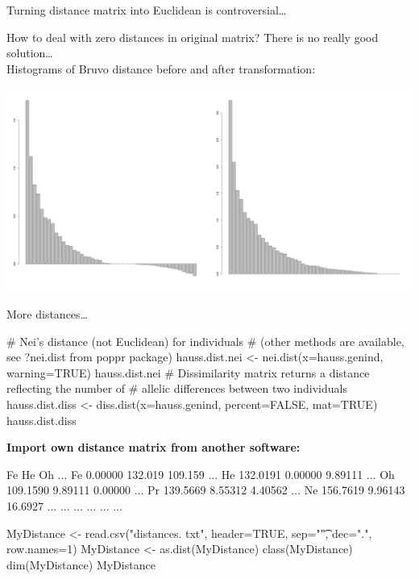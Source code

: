 \documentclass[compress, ucs, xelatex, 11pt, xcolor=svgnames,
  hyperref={
    bookmarks=true,
    unicode=true,
    colorlinks=true,
    pdftitle={Molecular data in R},
    plainpages=false,
    pdfauthor={Vojtech Zeisek},
    pdfsubject={Course about phylogeny and evolution in R},
    pdfcreator={XeLaTeX},
    pdfkeywords={R, evolution, phylogeny, molecular data},
    linkcolor=Tomato,
    anchorcolor=SaddleBrown,
    citecolor=Goldenrod,
    filecolor=DarkMagenta,
    menucolor=Sienna,
    urlcolor=DarkTurquoise,
    pdftex},
  url={hyphens, lowtilde} %
  ]{beamer}
\begin{document}
\begin{frame}{Turning distance matrix into Euclidean is controversial\ldots}
\begin{footnotesize}
  How to deal with zero distances in original matrix? There is no really good solution\ldots\\ Histograms of Bruvo distance before and after transformation:
\end{footnotesize}
\begin{center}
  \includegraphics[width=\textwidth]{bruvodist.png}
\end{center}
\end{frame}

\begin{frame}[fragile]{More distances\ldots}
  \begin{spluscode}
    # Nei's distance (not Euclidean) for individuals
    # (other methods are available, see ?nei.dist from poppr package)
    hauss.dist.nei <- nei.dist(x=hauss.genind, warning=TRUE)
    hauss.dist.nei
    # Dissimilarity matrix returns a distance reflecting the number of
    # allelic differences between two individuals
    hauss.dist.diss <- diss.dist(x=hauss.genind, percent=FALSE, mat=TRUE)
    hauss.dist.diss
  \end{spluscode}
\vfill
\textbf{Import own distance matrix from another software:}
\begin{multicols}{2}
  \begin{spluscode}
       Fe       He      Oh      ...
    Fe 0.00000  132.019 109.159 ...
    He 132.0191 0.00000 9.89111 ...
    Oh 109.1590 9.89111 0.00000 ...
    Pr 139.5669 8.55312 4.40562 ...
    Ne 156.7619 9.96143 16.6927 ...
    ... ...     ...     ...     ...
  \end{spluscode}
  \columnbreak
  \begin{spluscode}
    MyDistance <- read.csv("distances.
      txt", header=TRUE, sep="\t",
      dec=".", row.names=1)
    MyDistance <- as.dist(MyDistance)
    class(MyDistance)
    dim(MyDistance)
    MyDistance
  \end{spluscode}
\end{multicols}
\end{frame}
\end{document}
